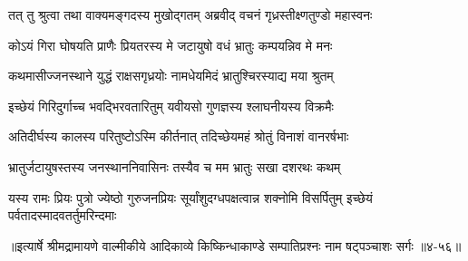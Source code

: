 \twolineshloka
{तत् तु श्रुत्वा तथा वाक्यमङ्गदस्य मुखोद्गतम्}
{अब्रवीद् वचनं गृध्रस्तीक्ष्णतुण्डो महास्वनः} %

\twolineshloka
{कोऽयं गिरा घोषयति प्राणैः प्रियतरस्य मे}
{जटायुषो वधं भ्रातुः कम्पयन्निव मे मनः} %

\twolineshloka
{कथमासीज्जनस्थाने युद्धं राक्षसगृध्रयोः}
{नामधेयमिदं भ्रातुश्चिरस्याद्य मया श्रुतम्} %

\twolineshloka
{इच्छेयं गिरिदुर्गाच्च भवद्भिरवतारितुम्}
{यवीयसो गुणज्ञस्य श्लाघनीयस्य विक्रमैः} %

\twolineshloka
{अतिदीर्घस्य कालस्य परितुष्टोऽस्मि कीर्तनात्}
{तदिच्छेयमहं श्रोतुं विनाशं वानरर्षभाः} %

\twolineshloka
{भ्रातुर्जटायुषस्तस्य जनस्थाननिवासिनः}
{तस्यैव च मम भ्रातुः सखा दशरथः कथम्} %

\threelineshloka
{यस्य रामः प्रियः पुत्रो ज्येष्ठो गुरुजनप्रियः}
{सूर्यांशुदग्धपक्षत्वान्न शक्नोमि विसर्पितुम्}
{इच्छेयं पर्वतादस्मादवतर्तुमरिन्दमाः} %


॥इत्यार्षे श्रीमद्रामायणे वाल्मीकीये आदिकाव्ये किष्किन्धाकाण्डे सम्पातिप्रश्नः नाम षट्पञ्चाशः सर्गः ॥४-५६॥
